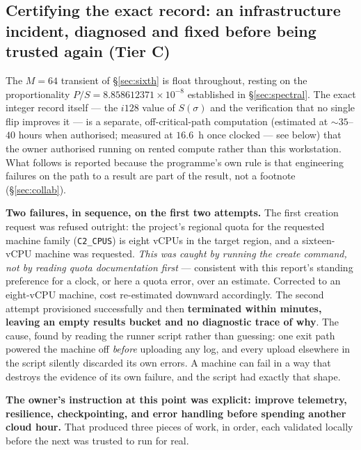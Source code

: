 \documentclass[11pt,a4paper]{article}
\newcommand{\tC}{\textcolor{TierC}{\textbf{Tier C}}}
\theoremstyle{definition}
\theoremstyle{plain}
\begin{document}
\subsection{Certifying the exact record: an infrastructure incident, diagnosed and fixed before
being trusted again (\tC{})}
\label{sec:gcp}

The $M=64$ transient of \S\ref{sec:sixth} is float throughout, resting on the proportionality
$P/S = 8.858612371\times10^{-8}$ established in \S\ref{sec:spectral}. The exact integer record itself ---
the $i128$ value of $S(\sigma)$ and the verification that no single flip improves it --- is a
separate, off-critical-path computation (estimated at $\sim35$--$40$ hours when authorised;
measured at $16.6$~h once clocked --- see below) that the owner
authorised running on rented compute rather than this workstation. What follows is reported
because the programme's own rule is that engineering failures on the path to a result are part of
the result, not a footnote (\S\ref{sec:collab}).

\textbf{Two failures, in sequence, on the first two attempts.} The first creation request was
refused outright: the project's regional quota for the requested machine family
(\texttt{C2\_CPUS}) is eight vCPUs in the target region, and a sixteen-vCPU machine was
requested. \emph{This was caught by running the
create command, not by reading quota documentation first} --- consistent with this report's
standing preference for a clock, or here a quota error, over an estimate. Corrected to an
eight-vCPU machine, cost re-estimated downward accordingly. The second attempt provisioned
successfully and then \textbf{terminated within minutes, leaving an empty results bucket and no
diagnostic trace of why}. The cause, found by reading the runner script rather than guessing: one
exit path powered the machine off \emph{before} uploading any log, and every upload elsewhere in
the script silently discarded its own errors. A machine can fail in a way that destroys the
evidence of its own failure, and the script had exactly that shape.

\textbf{The owner's instruction at this point was explicit: improve telemetry, resilience,
checkpointing, and error handling before spending another cloud hour.} That produced three
pieces of work, in order, each validated locally before the next was trusted to run for real.
\end{document}
